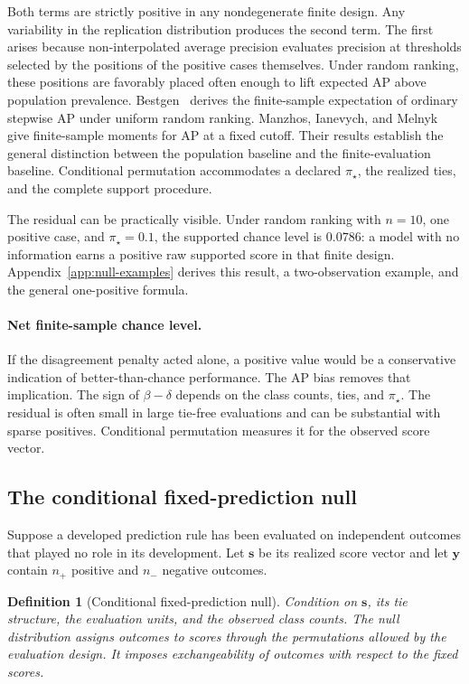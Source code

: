 \documentclass[11pt]{article}
\newtheorem{definition}{Definition}
\theoremstyle{remark}
\begin{document}
Both terms are strictly positive in any nondegenerate finite design. Any variability in the replication distribution produces the second term. The first arises because non-interpolated average precision evaluates precision at thresholds selected by the positions of the positive cases themselves. Under random ranking, these positions are favorably placed often enough to lift expected AP above population prevalence. Bestgen~\cite{bestgen2015random} derives the finite-sample expectation of ordinary stepwise AP under uniform random ranking. Manzhos, Ianevych, and Melnyk~\cite{manzhos2026average} give finite-sample moments for AP at a fixed cutoff. Their results establish the general distinction between the population baseline and the finite-evaluation baseline. Conditional permutation accommodates a declared $\pi_\star$, the realized ties, and the complete support procedure.

The residual can be practically visible. Under random ranking with $n=10$, one positive case, and $\pi_\star=0.1$, the supported chance level is $0.0786$: a model with no information earns a positive raw supported score in that finite design. Appendix~\ref{app:null-examples} derives this result, a two-observation example, and the general one-positive formula.

\paragraph{Net finite-sample chance level.}
If the disagreement penalty acted alone, a positive value would be a conservative indication of better-than-chance performance. The AP bias removes that implication. The sign of $\beta-\delta$ depends on the class counts, ties, and $\pi_\star$. The residual is often small in large tie-free evaluations and can be substantial with sparse positives. Conditional permutation measures it for the observed score vector.

\subsection{The conditional fixed-prediction null}
\label{sec:conditional-null}

Suppose a developed prediction rule has been evaluated on independent outcomes that played no role in its development. Let $\mathbf{s}$ be its realized score vector and let $\mathbf{y}$ contain $n_+$ positive and $n_-$ negative outcomes.

\begin{definition}[Conditional fixed-prediction null]
Condition on $\mathbf{s}$, its tie structure, the evaluation units, and the observed class counts. The null distribution assigns outcomes to scores through the permutations allowed by the evaluation design. It imposes exchangeability of outcomes with respect to the fixed scores.
\end{definition}
\end{document}
